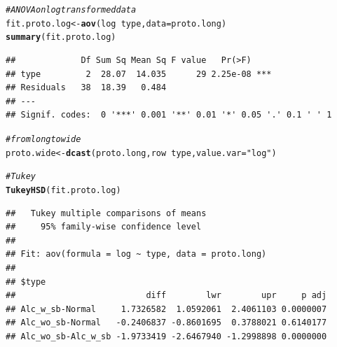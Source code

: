 \documentclass{article}\usepackage[]{graphicx}\usepackage[]{color}
\makeatletter
\newcommand{\hlstr}[1]{\textcolor[rgb]{0.192,0.494,0.8}{#1}}%
\newcommand{\hlcom}[1]{\textcolor[rgb]{0.678,0.584,0.686}{\textit{#1}}}%
\newcommand{\hlopt}[1]{\textcolor[rgb]{0,0,0}{#1}}%
\newcommand{\hlstd}[1]{\textcolor[rgb]{0.345,0.345,0.345}{#1}}%
\newcommand{\hlkwb}[1]{\textcolor[rgb]{0.69,0.353,0.396}{#1}}%
\newcommand{\hlkwc}[1]{\textcolor[rgb]{0.333,0.667,0.333}{#1}}%
\newcommand{\hlkwd}[1]{\textcolor[rgb]{0.737,0.353,0.396}{\textbf{#1}}}%
\newenvironment{kframe}{%
 \def\at@end@of@kframe{}%
 \ifinner\ifhmode%
  \def\at@end@of@kframe{\end{minipage}}%
  \begin{minipage}{\columnwidth}%
 \fi\fi%
 \def\FrameCommand##1{\hskip\@totalleftmargin \hskip-\fboxsep
 \colorbox{shadecolor}{##1}\hskip-\fboxsep
     \hskip-\linewidth \hskip-\@totalleftmargin \hskip\columnwidth}%
 \MakeFramed {\advance\hsize-\width
   \@totalleftmargin\z@ \linewidth\hsize
   \@setminipage}}%
 {\par\unskip\endMakeFramed%
 \at@end@of@kframe}
\newenvironment{knitrout}{}{} %
\makeatother
\begin{document}
\begin{knitrout}
\color{fgcolor}\begin{kframe}
\begin{alltt}
\hlcom{# ANOVA on log transformed data}
\hlstd{fit.proto.log} \hlkwb{<-} \hlkwd{aov}\hlstd{(log} \hlopt{~} \hlstd{type,} \hlkwc{data} \hlstd{= proto.long)}
\hlkwd{summary}\hlstd{(fit.proto.log)}
\end{alltt}
\begin{verbatim}
##             Df Sum Sq Mean Sq F value   Pr(>F)    
## type         2  28.07  14.035      29 2.25e-08 ***
## Residuals   38  18.39   0.484                     
## ---
## Signif. codes:  0 '***' 0.001 '**' 0.01 '*' 0.05 '.' 0.1 ' ' 1
\end{verbatim}
\begin{alltt}
\hlcom{# from long to wide}
\hlstd{proto.wide} \hlkwb{<-} \hlkwd{dcast}\hlstd{(proto.long, row} \hlopt{~} \hlstd{type,} \hlkwc{value.var} \hlstd{=} \hlstr{"log"}\hlstd{)}

\hlcom{# Tukey}
\hlkwd{TukeyHSD}\hlstd{(fit.proto.log)}
\end{alltt}
\begin{verbatim}
##   Tukey multiple comparisons of means
##     95% family-wise confidence level
## 
## Fit: aov(formula = log ~ type, data = proto.long)
## 
## $type
##                          diff        lwr        upr     p adj
## Alc_w_sb-Normal     1.7326582  1.0592061  2.4061103 0.0000007
## Alc_wo_sb-Normal   -0.2406837 -0.8601695  0.3788021 0.6140177
## Alc_wo_sb-Alc_w_sb -1.9733419 -2.6467940 -1.2998898 0.0000000
\end{verbatim}
\end{kframe}
\end{knitrout}
\end{document}
